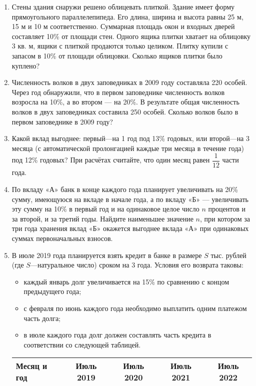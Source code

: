 \documentclass[12pt, a4paper]{article}
\begin{document}
	
	
	\begin{enumerate}
		\item Стены здания снаружи решено облицевать плиткой. Здание имеет форму прямоугольного параллелепипеда. Его длина, ширина и высота равны 25 м, 15 м и 10 м соответственно. Суммарная площадь окон и входных дверей составляет 10\% от площади стен. Одного ящика плитки хватает на облицовку 3 кв. м, ящики с плиткой продаются только целиком. Плитку купили с запасом в 10\% от площади облицовки. Сколько ящиков плитки было куплено?
		\item Численность волков в двух заповедниках в 2009 году составляла 220 особей. Через год обнаружили, что в первом заповеднике численность волков возросла на 10\%, а во втором — на 20\%. В результате общая численность волков в двух заповедниках составила 250 особей. Сколько волков было в первом заповеднике в 2009 году?
		\item Какой вклад выгоднее: первый—на 1 год под 13\% годовых, или второй—на 3 месяца (с автоматической пролонгацией
		каждые три месяца в течение года) под 12\% годовых? При расчётах считайте, что один месяц равен $\dfrac{1}{12}$ части года.
		\item По вкладу «А» банк в конце каждого года планирует увеличивать на 20\% сумму, имеющуюся на вкладе в начале года, а по вкладу «Б» — увеличивать эту сумму на 10\% в первый год и на одинаковое целое число $n$ процентов и за второй, и за третий годы. Найдите наименьшее значение $n$, при котором за три года хранения вклад «Б» окажется выгоднее вклада «А» при одинаковых суммах первоначальных взносов.
		\item В июле 2019 года планируется взять кредит в банке в размере $S$ тыс. рублей (где $S$—натуральное число) сроком на 3 года. Условия его возврата таковы:
		\begin{itemize}
			\item каждый январь долг увеличивается на 15\% по сравнению с концом предыдущего года;
			\item с февраля по июнь каждого года необходимо выплатить одним платежом часть долга;
			\item в июле каждого года долг должен составлять часть кредита в соответствии со следующей таблицей.
		\end{itemize}
		\begin{tabular}{ | l | c | c |  c | c |}
			\hline
			Месяц и год & Июль 2019 & Июль 2020 & Июль 2021 & Июль 2022 \\ \hline

\end{tabular}
\end{enumerate}
\end{document}
